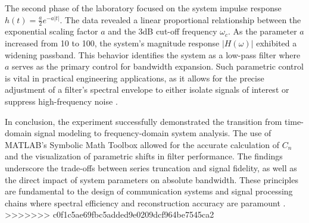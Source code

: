 The second phase of the laboratory focused on the system impulse response $h(t) = \frac{a}{2}e^{-a|t|}$. The data revealed a linear proportional relationship between the exponential scaling factor $a$ and the 3dB cut-off frequency $\omega_c$. As the parameter $a$ increased from 10 to 100, the system's magnitude response $|H(\omega)|$ exhibited a widening passband. This behavior identifies the system as a low-pass filter where $a$ serves as the primary control for bandwidth expansion. Such parametric control is vital in practical engineering applications, as it allows for the precise adjustment of a filter’s spectral envelope to either isolate signals of interest or suppress high-frequency noise \cite{riskin2003}.

In conclusion, the experiment successfully demonstrated the transition from time-domain signal modeling to frequency-domain system analysis. The use of MATLAB's Symbolic Math Toolbox allowed for the accurate calculation of $C_n$ and the visualization of parametric shifts in filter performance. The findings underscore the trade-offs between series truncation and signal fidelity, as well as the direct impact of system parameters on absolute bandwidth. These principles are fundamental to the design of communication systems and signal processing chains where spectral efficiency and reconstruction accuracy are paramount \cite{hsu2013}.
>>>>>>> c0f1c5ae69fbc5added9e0209dcf964be7545ca2

